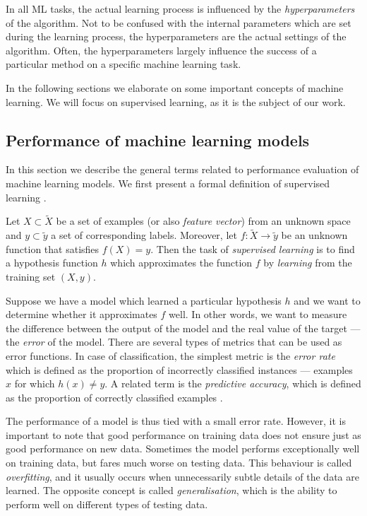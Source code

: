 In all ML tasks, the actual learning process is influenced by the
\emph{hyperparameters} of the algorithm. Not to be confused with the internal
parameters which are set during the learning process, the hyperparameters are the
actual settings of the algorithm. Often, the hyperparameters largely influence the
success of a particular method on a specific machine learning task.

In the following sections we elaborate on some important concepts of machine
learning. We will focus on supervised learning, as it is the subject of our work.

\subsection{Performance of machine learning models}
In this section we describe the general terms related to performance evaluation 
of machine learning models. We first present a formal 
definition of supervised learning \citep{Russell:2009:AIM:1671238,
Mitchell:1997:ML:541177}.

\begin{definition}
Let $X\subset\widetilde{X}$ be a set of examples (or also \emph{feature vector})
from an unknown space and $y\subset\widetilde{y}$ a set of corresponding labels.
Moreover, let $f: \widetilde{X} \rightarrow \widetilde{y}$ be an unknown function that
satisfies $f(X) = y$.
Then the task of \emph{supervised learning} is to find a hypothesis function
$h$ which approximates the function $f$ by \emph{learning} from the training
set $(X,y)$.

\end{definition}

Suppose we have a model which learned a particular hypothesis $h$ and we want
to determine whether it approximates $f$ well. In other words, we want to
measure the difference between the output of the model and the real value of
the target --- the \emph{error} of the model. There are several types of
metrics that can be used as error functions. In case of classification, the
simplest metric is the \emph{error rate} which is defined as the proportion of
incorrectly classified instances --- examples $x$ for which $h(x)\neq y$.
A related term is the \emph{predictive accuracy}, which is defined as the
proportion of correctly classified examples
\citep[p.~54]{Flach:2012:MLA:2490546}.

The performance of a model is thus tied with a small error rate. However, it is
important to note that good performance on training data does not ensure 
just as good performance on new data. Sometimes the model performs 
exceptionally well on training data, but fares much worse on testing data. 
This behaviour is called \emph{overfitting}, and it usually occurs when 
unnecessarily subtle details of the data are learned. The opposite concept 
is called \emph{generalisation}, which is the ability to perform well on 
different types of testing data.

